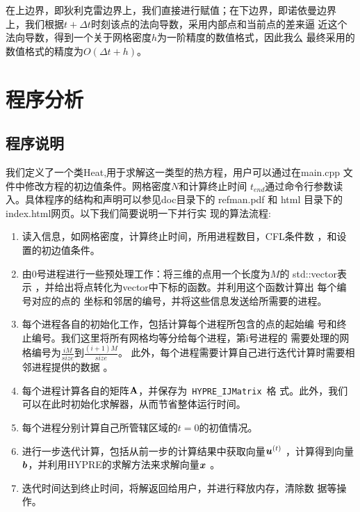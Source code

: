 \documentclass[a4paper,  11pt]{ctexart}
\newcommand{\bm}[1]{\mbox{\boldmath{$#1$}}}
\begin{document}
在上边界，即狄利克雷边界上，我们直接进行赋值；在下边界，即诺依曼边界
上，我们根据$t+\Delta t$时刻该点的法向导数，采用内部点和当前点的差来逼
近这个法向导数，得到一个关于网格密度$h$为一阶精度的数值格式，因此我么
最终采用的数值格式的精度为$O(\Delta t+h)$。
\section{程序分析}
\subsection{程序说明}
我们定义了一个类Heat,用于求解这一类型的热方程，用户可以通过在main.cpp
文件中修改方程的初边值条件。网格密度$N$和计算终止时间
$t_{end}$通过命令行参数读入。具体程序的结构和声明可以参见doc目录下的
refman.pdf 和 html 目录下的index.html网页。以下我们简要说明一下并行实
现的算法流程:
\begin{enumerate}
	\item 读入信息，如网格密度，计算终止时间，所用进程数目，CFL条件数
		，和设置的初边值条件。
	\item 由0号进程进行一些预处理工作：将三维的点用一个长度为$M$的
		std::vector表示
		，并给出将点转化为vector中下标的函数。并利用这个函数计算出
		每个编号对应的点的
		坐标和邻居的编号，并将这些信息发送给所需要的进程。
	\item 每个进程各自的初始化工作，包括计算每个进程所包含的点的起始编
		号和终止编号。我们这里将所有网格均等分给每个进程，第i号进程的
		需要处理的网格编号为$\frac{iM}{size}$到$\frac{(i+1)M}{size}$。
		此外，每个进程需要计算自己进行迭代计算时需要相邻进程提供的数据
		。
    \item 每个进程计算各自的矩阵${\bf A}$，并保存为~\verb|HYPRE_IJMatrix|~格
        式。此外，我们可以在此时初始化求解器，从而节省整体运行时间。
	\item 每个进程分别计算自己所管辖区域的$t=0$的初值情况。
    \item 进行一步迭代计算，包括从前一步的计算结果中获取向量$\bm u^{(t)}$
        ，计算得到向量$\bm b$，并利用HYPRE的求解方法来求解向量$\bm x$
        。
	\item 迭代时间达到终止时间，将解返回给用户，并进行释放内存，清除数
        据等操作。
\end{enumerate}
\end{document}
